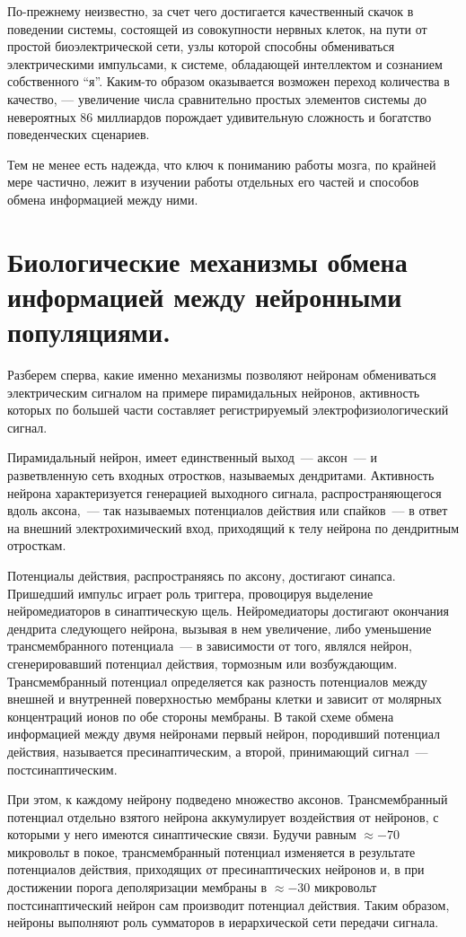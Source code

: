 По-прежнему неизвестно, за счет чего достигается
качественный скачок в поведении системы, состоящей из совокупности
нервных клеток, на пути от простой биоэлектрической сети,
узлы которой способны обмениваться электрическими импульсами, к
системе, обладающей интеллектом и сознанием собственного ``я''.
Каким-то образом оказывается возможен переход количества в качество, --- увеличение
числа сравнительно простых элементов системы до невероятных 86 миллиардов порождает удивительную
сложность и богатство поведенческих сценариев.

Тем не менее есть надежда, что ключ к пониманию работы мозга, по крайней мере
частично, лежит в изучении работы отдельных его частей и
способов обмена информацией между ними.

\section{Биологические механизмы обмена информацией между нейронными популяциями.}
Разберем сперва, какие именно механизмы позволяют нейронам обмениваться
электрическим сигналом на примере пирамидальных нейронов, активность которых по большей части
составляет регистрируемый электрофизиологический сигнал.

Пирамидальный нейрон, имеет единственный выход~--- аксон~--- и разветвленную сеть
входных отростков, называемых дендритами.  Активность нейрона характеризуется
генерацией выходного сигнала, распространяющегося вдоль аксона,~--- так
называемых потенциалов действия или спайков~--- в ответ на внешний
электрохимический вход, приходящий к телу нейрона по дендритным отросткам.

Потенциалы действия, распространяясь по аксону, достигают синапса.
Пришедший импульс играет роль триггера, провоцируя выделение
нейромедиаторов в  синаптическую щель. Нейромедиаторы достигают окончания
дендрита следующего нейрона, вызывая в нем увеличение, либо уменьшение
трансмембранного потенциала~--- в зависимости от того, являлся
нейрон, сгенерировавший потенциал действия, тормозным или возбуждающим.
Трансмембранный потенциал определяется как разность потенциалов между
внешней и внутренней поверхностью мембраны клетки и зависит от молярных
концентраций ионов по обе стороны мембраны.
В такой схеме обмена информацией между двумя нейронами первый нейрон,
породивший потенциал действия, называется пресинаптическим, а второй,
принимающий сигнал~--- постсинаптическим.

При этом, к каждому нейрону подведено множество аксонов.  Трансмембранный
потенциал отдельно взятого нейрона аккумулирует воздействия от нейронов, с
которыми у него имеются синаптические связи. Будучи равным $\approx -70$
микровольт в покое, трансмембранный потенциал изменяется в результате
потенциалов действия, приходящих от пресинаптических нейронов и, в при
достижении порога деполяризации мембраны в $\approx -30$ микровольт
постсинаптический нейрон сам производит потенциал действия.  Таким образом,
нейроны выполняют роль сумматоров в иерархической сети передачи сигнала.


